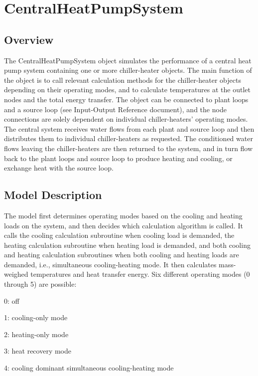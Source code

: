\section{CentralHeatPumpSystem }\label{centralheatpumpsystem}

\subsection{Overview}\label{overview-007}

The CentralHeatPumpSystem object simulates the performance of a central heat pump system containing one or more chiller-heater objects. The main function of the object is to call relevant calculation methods for the chiller-heater objects depending on their operating modes, and to calculate temperatures at the outlet nodes and the total energy transfer. The object can be connected to plant loops and a source loop (see Input-Output Reference document), and the node connections are solely dependent on individual chiller-heaters' operating modes. The central system receives water flows from each plant and source loop and then distributes them to individual chiller-heaters as requested. The conditioned water flows leaving the chiller-heaters are then returned to the system, and in turn flow back to the plant loops and source loop to produce heating and cooling, or exchange heat with the source loop.

\subsection{Model Description}\label{model-description-004}

The model first determines operating modes based on the cooling and heating loads on the system, and then decides which calculation algorithm is called. It calls the cooling calculation subroutine when cooling load is demanded, the heating calculation subroutine when heating load is demanded, and both cooling and heating calculation subroutines when both cooling and heating loads are demanded, i.e., simultaneous cooling-heating mode. It then calculates mass-weighed temperatures and heat transfer energy. Six different operating modes (0 through 5) are possible:

0: off

1: cooling-only mode

2: heating-only mode

3: heat recovery mode

4: cooling dominant simultaneous cooling-heating mode

